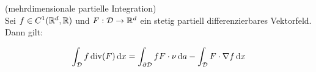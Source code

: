 \begin{Folgerung}(mehrdimensionale partielle Integration) \\
	\label{n_pI}
	Sei $ f \in C^1(\mathbb{R}^d, \mathbb{R})$ und $ F : \mathcal{D} \to \mathbb{R}^d $ ein stetig partiell differenzierbares Vektorfeld.
	Dann gilt:
	
	\begin{align*}
		\int_{\mathcal{D}} f \operatorname{div} ( F) \, \mathrm{d} x = \int_{\partial \mathcal{D}} f F \cdot \nu \, \mathrm{d} a
		- \int_{\mathcal{D}}  F \cdot \nabla f \, \mathrm{d} x
	\end{align*}
\end{Folgerung}





